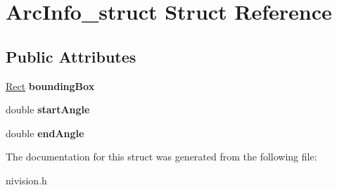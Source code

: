 \hypertarget{structArcInfo__struct}{\section{\-Arc\-Info\-\_\-struct \-Struct \-Reference}
\label{structArcInfo__struct}
}
\subsection*{\-Public \-Attributes}
\begin{DoxyCompactItemize}
\item 
\hypertarget{structArcInfo__struct_ad531b25d6055799f5050a0be997ed71f}{\hyperlink{structRect__struct}{\-Rect} {\bfseries bounding\-Box}}\label{structArcInfo__struct_ad531b25d6055799f5050a0be997ed71f}

\item 
\hypertarget{structArcInfo__struct_af2b2b21bc1598ece4c4ddbc1f843cdd7}{double {\bfseries start\-Angle}}\label{structArcInfo__struct_af2b2b21bc1598ece4c4ddbc1f843cdd7}

\item 
\hypertarget{structArcInfo__struct_a84b4a78d4f3b15196fb7d47ce7f60d47}{double {\bfseries end\-Angle}}\label{structArcInfo__struct_a84b4a78d4f3b15196fb7d47ce7f60d47}

\end{DoxyCompactItemize}


\-The documentation for this struct was generated from the following file\-:\begin{DoxyCompactItemize}
\item 
nivision.\-h\end{DoxyCompactItemize}
